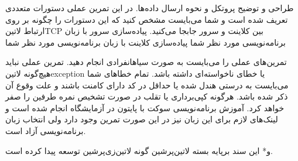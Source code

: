 \documentclass[]{article}
\begin{document}

   طراحی و توضیح پروتکل و نحوه ارسال داده‌ها. در این تمرین عملی دستورات متعددی تعریف شده است و شما می‌بایست مشخص کنید که این دستورات را چگونه بر روی ارتباط ‌لاتین{TCP} بین کلاینت و سرور جابجا می‌کنید.
   پیاده‌سازی سرور با زبان برنامه‌نویسی مورد نظر شما
   پیاده‌سازی کلاینت با زبان برنامه‌نویسی مورد نظر شما


   تمرین‌های عملی را می‌بایست به صورت ‌سیاه{انفرادی} انجام دهید.
   تمرین عملی نباید هیچ‌گونه ‌لاتین{exception} یا خطای ناخواسته‌ای داشته باشد. تمام خطاهای شما می‌بایست به درستی هندل شده یا حداقل در کد دارای کامنت باشند و علت وقوع آن ذکر شده باشد.
   هرگونه کپی‌برداری یا تقلب در صورت تشخیص نمره طرفین را صفر خواهد کرد.
   آموزش برنامه‌نویسی سوکت با پایتون در آزمایشگاه انجام شده است و لینک‌های لازم برای این زبان نیز در این صورت تمرین وجود دارد ولی انتخاب زبان برنامه‌نویسی آزاد است.

  ‌و*{}
این سند برپایه بسته ‌لاتین{‌پرشین} گونه ‌لاتین{‌زی‌پرشین} توسعه پیدا کرده است.
\end{document}
